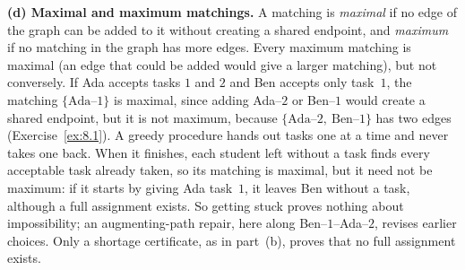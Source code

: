 {\textbf{(d) Maximal and maximum matchings.} A matching is \emph{maximal} if no edge of the graph can be added to it without creating a shared endpoint, and \emph{maximum} if no matching in the graph has more edges. Every maximum matching is maximal (an edge that could be added would give a larger matching), but not conversely. If Ada accepts tasks $1$ and $2$ and Ben accepts only task~$1$, the matching $\{\text{Ada--}1\}$ is maximal, since adding Ada--$2$ or Ben--$1$ would create a shared endpoint, but it is not maximum, because $\{\text{Ada--}2,\ \text{Ben--}1\}$ has two edges (Exercise~\ref{ex:8.1}). A greedy procedure hands out tasks one at a time and never takes one back. When it finishes, each student left without a task finds every acceptable task already taken, so its matching is maximal, but it need not be maximum: if it starts by giving Ada task~$1$, it leaves Ben without a task, although a full assignment exists. So getting stuck proves nothing about impossibility; an augmenting-path repair, here along Ben--$1$--Ada--$2$, revises earlier choices. Only a shortage certificate, as in part~(b), proves that no full assignment exists.}
